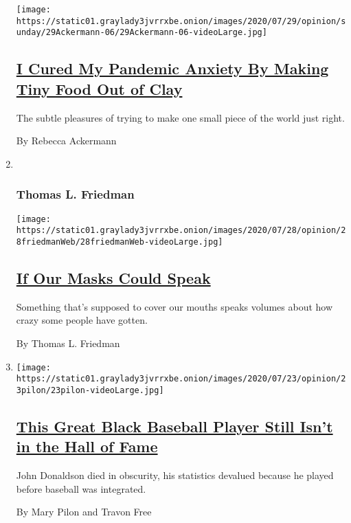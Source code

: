 \begin{enumerate}
  \texttt{[image: https://static01.graylady3jvrrxbe.onion/images/2020/07/29/opinion/sunday/29Ackermann-06/29Ackermann-06-videoLarge.jpg]}

  \hypertarget{i-cured-my-pandemic-anxiety-by-making-tiny-food-out-of-clay}{%
  \subsection{\texorpdfstring{\href{/2020/07/29/opinion/food-covid-quarantine-clay.html}{I
  Cured My Pandemic Anxiety By Making Tiny Food Out of
  Clay}}{I Cured My Pandemic Anxiety By Making Tiny Food Out of Clay}}\label{i-cured-my-pandemic-anxiety-by-making-tiny-food-out-of-clay}}

  The subtle pleasures of trying to make one small piece of the world
  just right.

  By Rebecca Ackermann
\item ~
  \hypertarget{thomas-l-friedman}{%
  \subsubsection{Thomas L. Friedman}\label{thomas-l-friedman}}

  \texttt{[image: https://static01.graylady3jvrrxbe.onion/images/2020/07/28/opinion/28friedmanWeb/28friedmanWeb-videoLarge.jpg]}

  \hypertarget{if-our-masks-could-speak}{%
  \subsection{\texorpdfstring{\href{/2020/07/28/opinion/coronavirus-masks.html}{If
  Our Masks Could
  Speak}}{If Our Masks Could Speak}}\label{if-our-masks-could-speak}}

  Something that's supposed to cover our mouths speaks volumes about how
  crazy some people have gotten.

  By Thomas L. Friedman
\item
  \texttt{[image: https://static01.graylady3jvrrxbe.onion/images/2020/07/23/opinion/23pilon/23pilon-videoLarge.jpg]}

  \hypertarget{this-great-black-baseball-player-still-isnt-in-the-hall-of-fame}{%
  \subsection{\texorpdfstring{\href{/2020/07/29/opinion/john-donaldson-baseball-black-players.html}{This
  Great Black Baseball Player Still Isn't in the Hall of
  Fame}}{This Great Black Baseball Player Still Isn't in the Hall of Fame}}\label{this-great-black-baseball-player-still-isnt-in-the-hall-of-fame}}

  John Donaldson died in obscurity, his statistics devalued because he
  played before baseball was integrated.

  By Mary Pilon and Travon Free
\end{enumerate}


